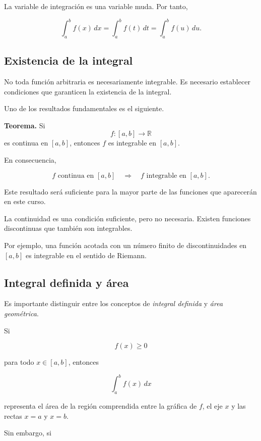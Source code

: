 \documentclass[12pt]{article}
\begin{document}
La variable de integración es una variable muda. Por tanto,

\[
\int_a^b f(x)\,dx
=
\int_a^b f(t)\,dt
=
\int_a^b f(u)\,du.
\]

\subsection{Existencia de la integral}

No toda función arbitraria es necesariamente integrable. Es necesario
establecer condiciones que garanticen la existencia de la integral.

Uno de los resultados fundamentales es el siguiente.

\textbf{Teorema.}
Si
\[
f:[a,b]\longrightarrow\mathbb{R}
\]
es continua en $[a,b]$, entonces $f$ es integrable en $[a,b]$.

En consecuencia,

\[
\boxed{
f\text{ continua en }[a,b]
\quad\Longrightarrow\quad
f\text{ integrable en }[a,b].
}
\]

Este resultado será suficiente para la mayor parte de las funciones que
aparecerán en este curso.

La continuidad es una condición suficiente, pero no necesaria. Existen
funciones discontinuas que también son integrables.

Por ejemplo, una función acotada con un número finito de discontinuidades
en $[a,b]$ es integrable en el sentido de Riemann.

\subsection{Integral definida y área}

Es importante distinguir entre los conceptos de \emph{integral definida}
y \emph{área geométrica}.

Si

\[
f(x)\geq0
\]

para todo $x\in[a,b]$, entonces

\[
\int_a^b f(x)\,dx
\]

representa el área de la región comprendida entre la gráfica de $f$, el
eje $x$ y las rectas $x=a$ y $x=b$.

Sin embargo, si
\end{document}
